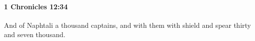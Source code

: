 
		\paragraph{1 Chronicles 12:34} %
			\label{1CHRONICLES-12-34}

			And of Naphtali a thousand captains, and with them with shield and spear thirty and seven thousand.


